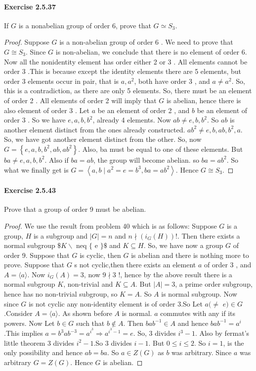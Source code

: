 \documentclass{article}
\begin{document}
\paragraph{Exercise 2.5.37} If $G$ is a nonabelian group of order 6, prove that $G \simeq S_3$.
\begin{proof}
    Suppose $G$ is a non-abelian group of order 6 . We need to prove that $G \cong S_3$. Since $G$ is non-abelian, we conclude that there is no element of order 6. Now all the nonidentity element has order either 2 or 3 . All elements cannot be order 3 .This is because except the identity elements there are 5 elements, but order 3 elements occur in pair, that is $a, a^2$, both have order 3 , and $a \neq a^2$. So, this is a contradiction, as there are only 5 elements. So, there must be an element of order 2 . All elements of order 2 will imply that $G$ is abelian, hence there is also element of order 3 . Let $a$ be an element of order 2 , and $b$ be an element of order 3 . So we have $e, a, b, b^2$, already 4 elements. Now $a b \neq e, b, b^2$. So $a b$ is another element distinct from the ones already constructed. $a b^2 \neq e, b, a b, b^2, a$. So, we have got another element distinct from the other. So, now $ G=\left\{e, a, b, b^2, a b, a b^2\right\}$. Also, ba must be equal to one of these elements. But $b a \neq e, a, b, b^2$. Also if $b a=a b$, the group will become abelian. so $b a=a b^2$. So what we finally get is $G=\left\langle a, b \mid a^2=e=b^3, b a=a b^2\right\rangle$. Hence $G \cong S_3$.
\end{proof}


\paragraph{Exercise 2.5.43} Prove that a group of order 9 must be abelian.
\begin{proof}
    We use the result from problem 40 which is as follows: Suppose $G$ is a group, $H$ is a subgroup and $|G|=n$ and $n \nmid\left(i_G(H)\right) !$. Then there exists a normal subgroup $\$ K \backslash$ neq $\{$ e $\} \$$ and $K \subseteq H$.
So, we have now a group $G$ of order 9. Suppose that $G$ is cyclic, then $G$ is abelian and there is nothing more to prove. Suppose that $G$ s not cyclic,then there exists an element $a$ of order 3 , and $A=\langle a\rangle$. Now $i_G(A)=3$, now $9 \nmid 3$ !, hence by the above result there is a normal subgroup $K$, non-trivial and $K \subseteq A$. But $|A|=3$, a prime order subgroup, hence has no non-trivial subgroup, so $K=A$. So $A$ is normal subgroup. Now since $G$ is not cyclic any non-identity element is of order 3.So Let $a(\neq$ $e) \in G$.Consider $A=\langle a\rangle$. As shown before $A$ is normal. $a$ commutes with any if its powers. Now Let $b \in G$ such that $b \notin A$. Then $b a b^{-1} \in A$ and hence $b a b^{-1}=a^i$.This implies $a=b^3 a b^{-3}=a^{i^3} \Longrightarrow a^{i^3-1}=e$. So, 3 divides $i^3-1$. Also by fermat's little theorem 3 divides $i^2-1$.So 3 divides $i-1$. But $0 \leq i \leq 2$. So $i=1$, is the only possibility and hence $a b=b a$. So $a \in Z(G)$ as $b$ was arbitrary. Since $a$ was arbitrary $G=Z(G)$. Hence $G$ is abelian.
\end{proof}
\end{document}

